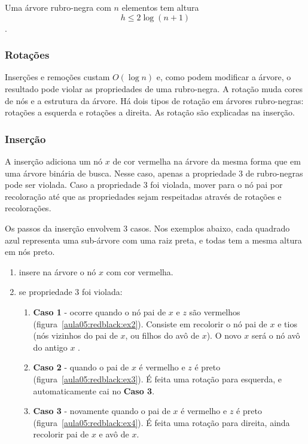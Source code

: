\begin{theorem}
Uma árvore rubro-negra com $n$ elementos tem altura
\[ h \leq 2 \log (n + 1) \].
\end{theorem}

\subsubsection{Rotações}

Inserções e remoções custam $O(\log n)$ e, como podem modificar a árvore,
o resultado pode violar as propriedades de uma rubro-negra.
A rotação muda cores de nós e a estrutura da árvore.
Há dois tipos de rotação em árvores rubro-negras: rotações a esquerda e 
rotações a direita.
As rotação são explicadas na inserção.

\subsubsection{Inserção}

A inserção adiciona um nó $x$ de cor vermelha na árvore da mesma forma que 
em uma árvore binária de busca.
Nesse caso, apenas a propriedade 3 de rubro-negras pode ser violada.
Caso a propriedade 3 foi violada, mover para o nó pai por recoloração até que
as propriedades sejam respeitadas através de rotações e recolorações.

Os passos da inserção envolvem 3 casos. Nos exemplos abaixo,
cada quadrado azul representa uma sub-árvore com uma raiz preta, e todas
tem a mesma altura em nós preto.
\begin{enumerate}
\item insere na árvore o nó $x$ com cor vermelha.
\item se propriedade 3 foi violada:
	\begin{enumerate}
	\item {\bf Caso 1} - ocorre quando o nó pai de $x$ e $z$ são vermelhos
	(figura~\ref{aula05:redblack:ex2}).
	Consiste em recolorir o nó pai de $x$ e tios (nós vizinhos do pai de $x$, ou
	filhos do avô de $x$).
	O novo $x$ será o nó avô do antigo $x$ .
	\item {\bf Caso 2} - quando o pai de $x$ é vermelho e $z$ é preto
		(figura~\ref{aula05:redblack:ex3}).
		É feita uma rotação para esquerda, e automaticamente cai no {\bf Caso 3}.
	\item {\bf Caso 3} - novamente quando o pai de $x$ é vermelho e $z$ é preto
		(figura~\ref{aula05:redblack:ex4}).
		É feita uma rotação para direita, ainda recolorir pai de $x$ e avô de $x$.
	\end{enumerate}
\end{enumerate}


